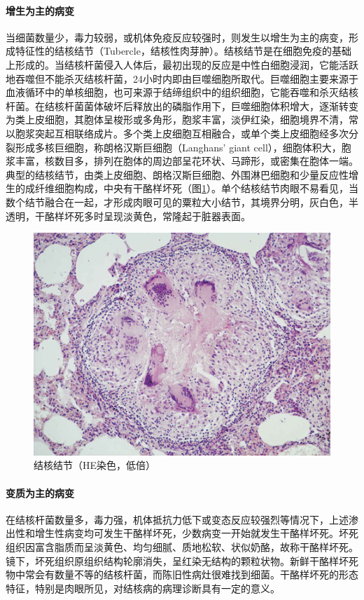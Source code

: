 \paragraph{增生为主的病变}
当细菌数量少，毒力较弱，或机体免疫反应较强时，则发生以增生为主的病变，形成特征性的结核结节（Tubercle，结核性肉芽肿）。结核结节是在细胞免疫的基础上形成的。当结核杆菌侵入人体后，最初出现的反应是中性白细胞浸润，它能活跃地吞噬但不能杀灭结核杆菌，24小时内即由巨噬细胞所取代。巨噬细胞主要来源于血液循环中的单核细胞，也可来源于结缔组织中的组织细胞，它能吞噬和杀灭结核杆菌。在结核杆菌菌体破坏后释放出的磷脂作用下，巨噬细胞体积增大，逐渐转变为类上皮细胞，其胞体呈梭形或多角形，胞浆丰富，淡伊红染，细胞境界不清，常以胞浆突起互相联络成片。多个类上皮细胞互相融合，或单个类上皮细胞经多次分裂形成多核巨细胞，称朗格汉斯巨细胞（Langhans'
giant
cell），细胞体积大，胞浆丰富，核数目多，排列在胞体的周边部呈花环状、马蹄形，或密集在胞体一端。典型的结核结节，由类上皮细胞、朗格汉斯巨细胞、外围淋巴细胞和少量反应性增生的成纤维细胞构成，中央有干酪样坏死（图\ref{fig14-2}）。单个结核结节肉眼不易看见，当数个结节融合在一起，才形成肉眼可见的粟粒大小结节，其境界分明，灰白色，半透明，干酪样坏死多时呈现淡黄色，常隆起于脏器表面。

\begin{figure}[!htbp]
    \centering
    \includegraphics{./images/Image00226.jpg}
    \captionsetup{justification=centering}
    \caption{结核结节（HE染色，低倍）}
    \label{fig14-2}
\end{figure}

\paragraph{变质为主的病变}
在结核杆菌数量多，毒力强，机体抵抗力低下或变态反应较强烈等情况下，上述渗出性和增生性病变均可发生干酪样坏死，少数病变一开始就发生干酪样坏死。坏死组织因富含脂质而呈淡黄色、均匀细腻、质地松软、状似奶酪，故称干酪样坏死。镜下，坏死组织原组织结构轮廓消失，呈红染无结构的颗粒状物。新鲜干酪样坏死物中常会有数量不等的结核杆菌，而陈旧性病灶很难找到细菌。干酪样坏死的形态特征，特别是肉眼所见，对结核病的病理诊断具有一定的意义。

